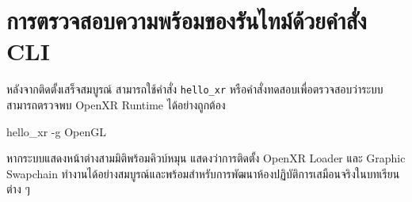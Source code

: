 \section{การตรวจสอบความพร้อมของรันไทม์ด้วยคำสั่ง CLI}

หลังจากติดตั้งเสร็จสมบูรณ์ สามารถใช้คำสั่ง \texttt{hello\_xr} หรือคำสั่งทดสอบเพื่อตรวจสอบว่าระบบสามารถตรวจพบ OpenXR Runtime ได้อย่างถูกต้อง
\begin{codebox}
hello_xr -g OpenGL
\end{codebox}

หากระบบแสดงหน้าต่างสามมิติพร้อมคิวบ์หมุน แสดงว่าการติดตั้ง OpenXR Loader และ Graphic Swapchain ทำงานได้อย่างสมบูรณ์และพร้อมสำหรับการพัฒนาห้องปฏิบัติการเสมือนจริงในบทเรียนต่าง ๆ
\clearpage
